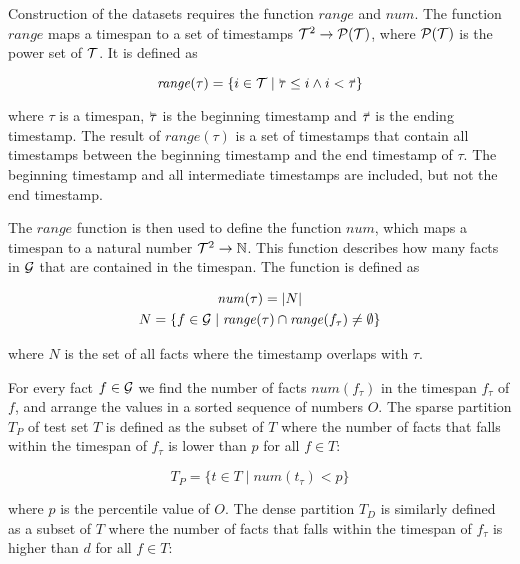 Construction of the datasets requires the function $\mathit{range}$ and $\mathit{num}$. 
The function $\mathit{range}$ maps a timespan to a set of timestamps $\mathcal{T}^2 \rightarrow \mathcal{P}(\mathcal{T})$, where $\mathcal{P}(\mathcal{T})$ is the power set of $\mathcal{T}$. 
It is defined as

\begin{equation}
\mathit{range}(\tau) = \{ i \in \varT \mid \timebegin{\tau} \leq i \wedge i < \timeend{\tau} \}
\end{equation}

\noindent
where $\tau$ is a timespan, $\timebegin{\tau}$ is the beginning timestamp and $\timeend{\tau}$ is the ending timestamp.
The result of $\mathit{range}(\tau)$ is a set of timestamps that contain all timestamps between the beginning timestamp and the end timestamp of $\tau$. The beginning timestamp and all intermediate timestamps are included, but not the end timestamp.

The $\mathit{range}$ function is then used to define the function $\mathit{num}$, which maps a timespan to a natural number $\mathcal{T}^2 \rightarrow \mathbb{N}$. This function describes how many facts in $\mathcal{G}$ that are contained in the timespan. The function is defined as

\begin{equation}
\begin{gathered}
\mathit{num}(\tau) = | N |\\
N = \{ f \in \mathcal{G} \mid \mathit{range}(\tau) \cap \mathit{range}(f_\tau) \neq \emptyset \}
\end{gathered}
\end{equation}

\noindent
where $N$ is the set of all facts where the timestamp overlaps with $\tau$.

For every fact $f \in \mathcal{G}$ we find the number of facts $\mathit{num}(f_\tau)$ in the timespan $f_\tau$ of $f$, and arrange the values in a sorted sequence of numbers $O$.
The sparse partition $T_P$ of test set $T$ is defined as the subset of $T$ where the number of facts that falls within the timespan of $f_\tau$ is lower than $p$ for all $f \in T$:

\begin{equation}
T_P = \{ t \in T \mid \textit{num}(t_\tau) < p \}
\end{equation}

\noindent
where $p$ is the  percentile value of $O$. The dense partition $T_D$ is similarly defined as a subset of $T$ where the number of facts that falls within the timespan of $f_\tau$ is higher than $d$ for all $f \in T$:

